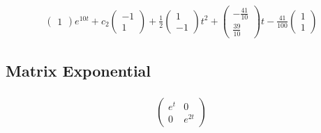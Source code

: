 \documentclass{article}
\begin{document}
\begin{align*}
\begin{pmatrix}
                        1
                      \end{pmatrix} e^{10 t} + c_2 \begin{pmatrix}
                                                     -1 \\
                                                     1
                                                   \end{pmatrix} + \frac{1}{2} \begin{pmatrix}
                                                                                 1 \\
                                                                                 -1
                                                                               \end{pmatrix} t^2 + \begin{pmatrix}
                                                                                                     -\frac{41}{10} \\
                                                                                                     \frac{39}{10}
                                                                                                   \end{pmatrix} t - \frac{41}{100} \begin{pmatrix}
                                                                                                                                      1 \\
                                                                                                                                      1
                                                                                                                                    \end{pmatrix}
\end{align*}

\subsection{Matrix Exponential}

\subsubsection{}

\[\begin{pmatrix}
    e^t & 0       \\
    0   & e^{2 t}
  \end{pmatrix}\]
\end{document}
